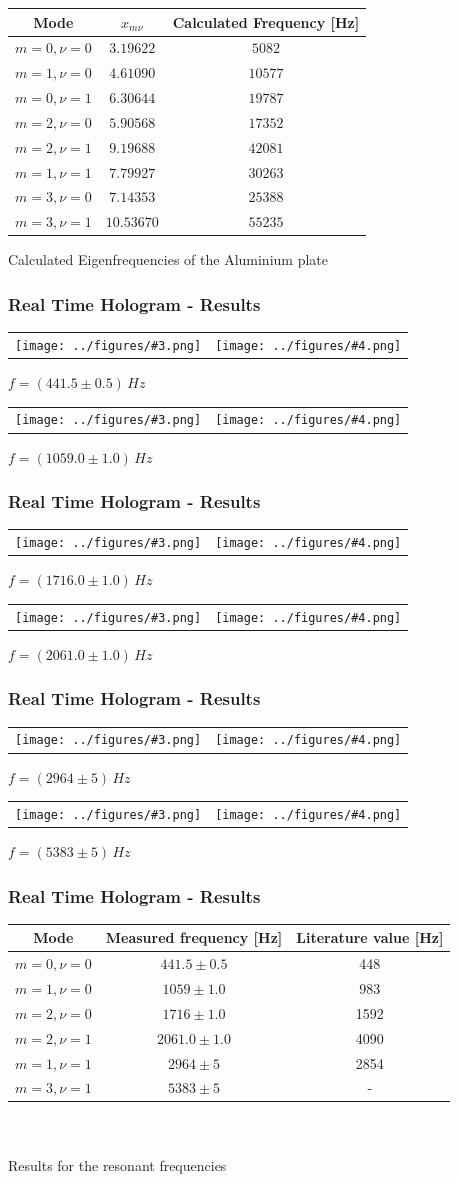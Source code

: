 \documentclass[10pt]{beamer}
\newcommand{\graTwoOneC}[5]{
	\begin{table}
		\centering
		\begin{tabular}[width=\textwidth]{cc}
			\texttt{[image: ../figures/\#3.png]}&
			\texttt{[image: ../figures/\#4.png]}\\
		\end{tabular}
		#5
	\end{table}
}
\begin{document}
\begin{frame}
	\begin{table}[h]
		\centering
		\begin{tabular}{c|c|c}
			Mode 		& $x_{m\nu}$ & Calculated Frequency [Hz] 	 \\ \hline\hline
			$m=0,\nu=0$	&$3.19622$   &$5082$						\\ \hline
			$m=1,\nu=0$	& $4.61090$  & $10577$					\\ \hline
			$m=0,\nu=1$	& $6.30644$  & $19787$					\\ \hline
			$m=2,\nu=0$	& $5.90568$  & $17352$					\\ \hline
			$m=2,\nu=1$	& $9.19688$  & $42081$					\\ \hline
			$m=1,\nu=1$	& $7.79927$  & $30263$				     \\ \hline
			$m=3,\nu=0$	& $7.14353$  & $25388$                \\ \hline
			$m=3,\nu=1$	& $10.53670$ & $55235$
		\end{tabular} \vskip 0.2cm
		{Calculated Eigenfrequencies of the Aluminium plate}
	\end{table}	
\end{frame}
\begin{frame}
	\frametitle{Real Time Hologram - Results}
	\graTwoOneC{0.4}{0.2}{aluminium2_edit}{aluminium2_lit}{$f=(441.5\pm0.5)\,\si{Hz}$}
	\graTwoOneC{0.4}{0.2}{aluminium3_edit}{aluminium3_lit}{$f=(1059.0\pm1.0)\,\si{Hz}$}
\end{frame}
\begin{frame}
	\frametitle{Real Time Hologram - Results}
	\graTwoOneC{0.4}{0.2}{aluminium6_edit}{aluminium6_lit}{$f=(1716.0\pm1.0)\,\si{Hz}$}
	\graTwoOneC{0.4}{0.2}{aluminium7_edit}{aluminium7_lit}{$f=(2061.0\pm1.0)\,\si{Hz}$}
\end{frame}
\begin{frame}
	\frametitle{Real Time Hologram - Results}
	\graTwoOneC{0.4}{0.2}{aluminium9_edit}{aluminium9_lit}{$f=(2964\pm5)\,\si{Hz}$}
	\graTwoOneC{0.4}{0.2}{aluminium10_edit}{aluminium10_lit}{$f=(5383\pm5)\,\si{Hz}$}
\end{frame}

\begin{frame}
	\frametitle{Real Time Hologram - Results}
	\begin{table}
		\centering
		\begin{tabular}{c|c|c}
			Mode 		& Measured frequency [Hz] 	& Literature value [Hz]\\ \hline\hline
			$m=0,\nu=0$	& $441.5\pm0.5$					& 448	\\ \hline
			$m=1,\nu=0$	& $1059\pm1.0$				& 983	\\ \hline
			$m=2,\nu=0$	& $1716\pm1.0$				& 1592	\\ \hline
			$m=2,\nu=1$	& $2061.0\pm1.0$				& 4090	\\ \hline
			$m=1,\nu=1$	& $2964\pm5$				& 2854 \\ \hline
			$m=3,\nu=1$	& $5383\pm5$				&-
		\end{tabular}\\\scriptsize\ \\\small
		{Results for the resonant frequencies}
	\end{table}
\end{frame}
\end{document}
